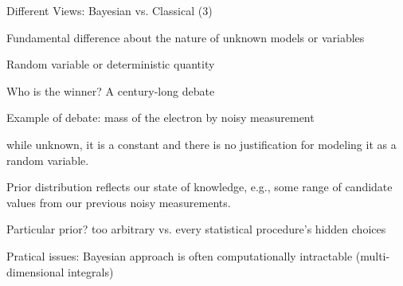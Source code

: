 \begin{frame}{Different Views: Bayesian vs. Classical (3)}


\plitemsep 0.1in
\bci
\item Fundamental difference about the nature of unknown models or variables

\item Random variable or deterministic quantity 

\item Who is the winner? A century-long debate 
  
\item Example of debate: mass of the electron by noisy measurement
  \bci
\item {} while unknown, it is a constant and there is no
  justification for modeling it as a random variable. 
  
\item {}  Prior distribution reflects our state of knowledge,
  e.g., some range of candidate values from our previous noisy
  measurements. 
  \eci

\item Particular prior? too arbitrary vs. every statistical
  procedure's hidden choices  

\item Pratical issues: Bayesian approach is often computationally
  intractable (multi-dimensional integrals)

  \eci


\end{frame}


